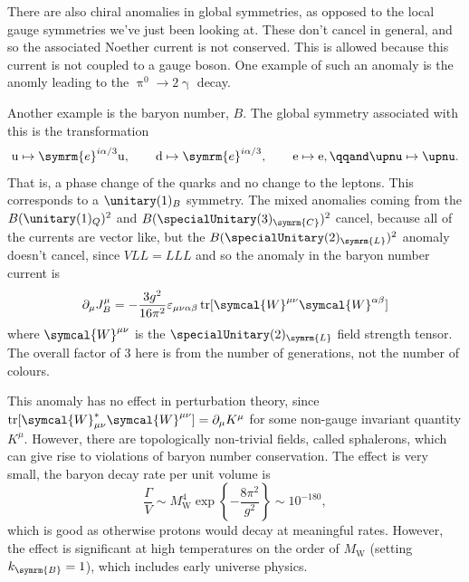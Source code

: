 \documentclass[fleqn]{NotesClass}
\newcommand{\Pparticle}[1]{\mathrm{#1}}
\newcommand{\Pphoton}{\ensuremath{\upgamma}}
\newcommand{\Pu}{\ensuremath{\Pparticle{u}}}
\newcommand{\Pd}{\ensuremath{\Pparticle{d}}}
\newcommand{\Pex}{\ensuremath{\Pparticle{e}}}
\newcommand{\Pnu}{\ensuremath{\upnu}}
\newcommand{\PW}{\ensuremath{\Pparticle{W}}}
\newcommand{\Ppizero}{\ensuremath{\uppi^{0}}}
\newcommand{\e}{\symrm{e}}
\DeclareMathOperator{\tr}{tr}
\newcommand{\Left}{\symrm{L}}
\newcommand{\boltzmann}{k_{\symrm{B}}}
\begin{document}
    There are also chiral anomalies in global symmetries, as opposed to the local gauge symmetries we've just been looking at.
    These don't cancel in general, and so the associated Noether current is not conserved.
    This is allowed because this current is not coupled to a gauge boson.
    One example of such an anomaly is the anomly leading to the \(\Ppizero \to 2\Pphoton\) decay.
   
    Another example is the baryon number, \(B\).
    The global symmetry associated with this is the transformation
    \begin{equation}
        \Pu \mapsto \e^{i\alpha/3} \Pu, \qquad \Pd \mapsto \e^{i\alpha/3}, \qquad \Pex \mapsto \Pex, \qqand \Pnu \mapsto \Pnu.
    \end{equation}
    That is, a phase change of the quarks and no change to the leptons.
    This corresponds to a \(\unitary(1)_{B}\) symmetry.
    The mixed anomalies coming from the \(B(\unitary(1)_{Q})^2\) and \(B(\specialUnitary(3)_{\symrm{C}})^2\) cancel, because all of the currents are vector like, but the \(B(\specialUnitary(2)_{\Left})^2\) anomaly doesn't cancel, since \(VLL = LLL\) and so the anomaly in the baryon number current is
    \begin{equation}
        \partial_\mu J^\mu_B = -\frac{3g^2}{16\pi^2} \varepsilon_{\mu\nu\alpha\beta} \tr[\symcal{W}^{\mu\nu} \symcal{W}^{\alpha\beta}]
    \end{equation}
    where \(\symcal{W}^{\mu\nu}\) is the \(\specialUnitary(2)_{\Left}\) field strength tensor.
    The overall factor of 3 here is from the number of generations, not the number of colours.
    
    This anomaly has no effect in perturbation theory, since \(\tr[\symcal{W}^*_{\mu\nu}\symcal{W}^{\mu\nu}] = \partial_\mu K^\mu\) for some non-gauge invariant quantity \(K^\mu\).
    However, there are topologically non-trivial fields, called sphalerons, which can give rise to violations of baryon number conservation.
    The effect is very small, the baryon decay rate per unit volume is
    \begin{equation}
        \frac{\Gamma}{V} \sim M_{\PW}^4 \exp\left\{ -\frac{8\pi^2}{g^2} \right\} \sim 10^{-180},
    \end{equation}
    which is good as otherwise protons would decay at meaningful rates.
    However, the effect is significant at high temperatures on the order of \(M_{\PW}\) (setting \(\boltzmann = 1\)), which includes early universe physics.
    
\end{document}
